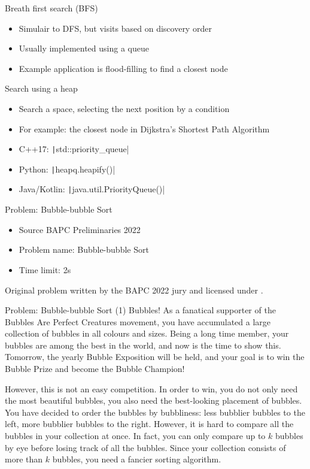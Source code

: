 \documentclass[11pt,pdf, aspectratio=169]{beamer}
\begin{document}
  \begin{frame}{Breath first search (BFS)}
    \begin{itemize}
      \item Simulair to DFS, but visits based on discovery order
      \item Usually implemented using a queue
      \item Example application is flood-filling to find a closest node
    \end{itemize}
  \end{frame}
  \begin{frame}{Search using a heap}
    \begin{itemize}
      \item Search a space, selecting the next position by a condition
      \item For example: the closest node in Dijkstra's Shortest Path Algorithm
      \item C++17: \texttt|std::priority_queue|
      \item Python: \texttt|heapq.heapify()|
      \item Java/Kotlin: \texttt|java.util.PriorityQueue()|
    \end{itemize}
  \end{frame}
  \begin{frame}{Problem: Bubble-bubble Sort}
    \begin{itemize}
      \item Source BAPC Preliminaries 2022
      \item Problem name: Bubble-bubble Sort
      \item Time limit: 2s
    \end{itemize}
    Original problem written by the BAPC 2022 jury and licensed under \doclicenseLongNameRef.

    \doclicenseImage

  \end{frame}
  \begin{frame}{Problem: Bubble-bubble Sort (1)}
    Bubbles!
    As a fanatical supporter of the Bubbles Are Perfect Creatures movement, you have accumulated a large collection of bubbles in all colours and sizes.
    Being a long time member, your bubbles are among the best in the world, and now is the time to show this.
    Tomorrow, the yearly Bubble Exposition will be held, and your goal is to win the Bubble Prize and become the Bubble Champion!

    However, this is not an easy competition.
    In order to win, you do not only need the most beautiful bubbles, you also need the best-looking placement of bubbles.
    You have decided to order the bubbles by bubbliness: less bubblier bubbles to the left, more bubblier bubbles to the right.
    However, it is hard to compare all the bubbles in your collection at once. In fact, you can only compare up to $k$ bubbles by eye before losing track of all the bubbles.
    Since your collection consists of more than $k$ bubbles, you need a fancier sorting algorithm.


  \end{frame}
\end{document}

